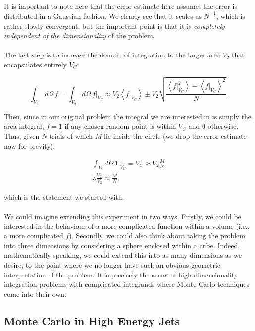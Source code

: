 It is important to note here that the error estimate here assumes the error is distributed in a Gaussian fashion. We clearly see that it scales as $N^{-\frac{1}{2}}$, which is rather slowly convergent, but the important point is that it is \emph{completely independent of the dimensionality} of the problem.  \\
\\
The last step is to increase the domain of integration to the larger area $V_2$ that encapsulates entirely $V_C$:

\begin{equation}
\int_{V_C} d \Omega \hspace{2pt} f  = \int_{V_2} d \Omega \hspace{2pt} f|_{V_C} \approx V_2 \left< f|_{V_C}  \right> \pm V_2 \sqrt{\frac{\left< f|_{V_C} ^2 \right> - \left< f|_{V_C}  \right>^2}{N}}.
\end{equation}

Then, since in our original problem the integral we are interested in is simply the area integral, $f = 1$ if any chosen random point is within $V_C$ and $0$ otherwise. Thus, given $N$ trials of which $M$ lie inside the circle (we drop the error estimate now for brevity),

\begin{equation}
\begin{split}
\int_{V_2} d \Omega \hspace{2pt} 1|_{V_C} = V_C \approx V_2 \frac{M}{N} \\
\therefore \frac{V_C}{V_2} \approx \frac{M}{N},
\end{split}
\end{equation}

which is the statement we started with. \\
\\
We could imagine extending this experiment in two ways. Firstly, we could be interested in the behaviour of a more complicated function within a volume (i.e., a more complicated $f$). Secondly, we could also think about taking the problem into three dimensions by considering a sphere enclosed within a cube. Indeed, mathematically speaking, we could extend this into as many dimensions as we desire, to the point where we no longer have such an obvious geometric interpretation of the problem. It is precisely the arena of high-dimensionality integration problems with complicated integrands where Monte Carlo techniques come into their own.

\subsection{Monte Carlo in High Energy Jets}

